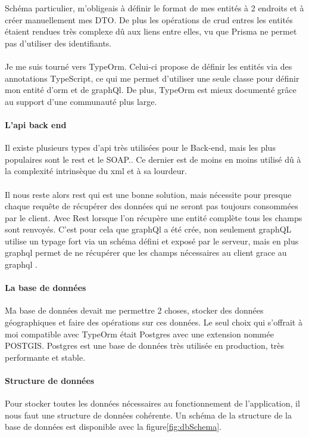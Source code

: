 Schéma particulier, m'obligeais à définir le format de mes entités à 2 endroits et à créer manuellement mes DTO\@.
De plus les opérations de \Gls{crud} entres les entités étaient rendues très complexe dû aux liens entre elles, vu que Prisma ne permet pas d'utiliser des identifiants.\\\\
Je me suis tourné vers TypeOrm.
Celui-ci propose de définir les entités via des annotations TypeScript, ce qui me permet d'utiliser une seule classe pour définir mon entité d'\Gls{orm} et de graphQl.
De plus, TypeOrm est mieux documenté grâce au support d'une communauté plus large.

\paragraph{L'\Gls{api} back end}
Il existe plusieurs types d'\Gls{api} très utilisées pour le Back-end, mais les plus populaires sont le \Gls{rest} et le SOAP.\@.
Ce dernier est de moins en moins utilisé dû à la complexité intrinsèque du xml et à sa lourdeur.\\\\
Il nous reste alors \Gls{rest} qui est une bonne solution, mais nécessite pour presque chaque requête de récupérer des données qui ne seront pas toujours consommées par le client.
Avec Rest lorsque l'on récupère une entité complète tous les champs sont renvoyés.
C'est pour cela que graphQl a été crée, non seulement graphQL utilise un typage fort via un schéma défini et exposé par le serveur,
mais en plus \Gls{graphql} permet de ne récupérer que les champs nécessaires au client grace au \Gls{graphql} .

\paragraph{La base de données}
Ma base de données devait me permettre 2 choses, stocker des données géographiques et faire des opérations sur ces données.
Le seul choix qui s'offrait à moi compatible avec TypeOrm était Postgres avec une extension nommée POSTGIS\@.
Postgres est une base de données très utilisée en production, très performante et stable.

\paragraph{Structure de données}
Pour stocker toutes les données nécessaires au fonctionnement de l'application, il nous faut une structure de données cohérente.
Un schéma de la structure de la base de données est disponible avec la figure\ref{fig:dbSchema}.


